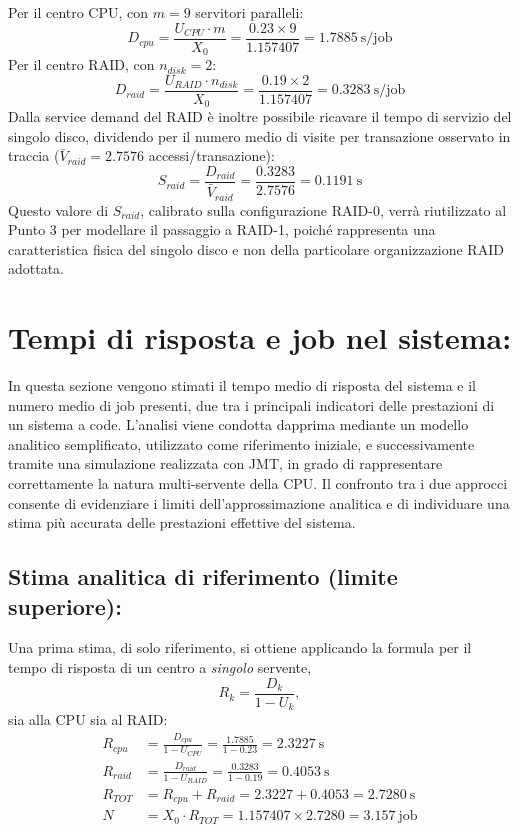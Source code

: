 \documentclass[11pt,a4paper]{article}
\begin{document}
Per il centro CPU, con $m=9$ servitori paralleli:
\begin{equation}
D_{cpu} = \frac{U_{CPU}\cdot m}{X_0} = \frac{0.23 \times 9}{1.157407} = 1.7885\ \text{s/job}
\end{equation}
Per il centro RAID, con $n_{disk}=2$:
\begin{equation}
D_{raid} = \frac{U_{RAID}\cdot n_{disk}}{X_0} = \frac{0.19\times 2}{1.157407} = 0.3283\ \text{s/job}
\end{equation}
Dalla service demand del RAID è inoltre possibile ricavare il tempo di servizio del singolo
disco, dividendo per il numero medio di visite per transazione osservato in traccia
($\bar V_{raid}=2.7576$ accessi/transazione):
\begin{equation}
S_{raid} = \frac{D_{raid}}{\bar V_{raid}} = \frac{0.3283}{2.7576} = 0.1191\ \text{s}
\end{equation}
Questo valore di $S_{raid}$, calibrato sulla configurazione RAID-0, verrà riutilizzato al Punto 3 per
modellare il passaggio a RAID-1, poiché rappresenta una caratteristica fisica del singolo disco e
non della particolare organizzazione RAID adottata.

\section{Tempi di risposta e job nel sistema: }
In questa sezione vengono stimati il tempo medio di risposta del sistema e il numero medio di job presenti, due tra i principali indicatori delle prestazioni di un sistema a code. L'analisi viene condotta dapprima mediante un modello analitico semplificato, utilizzato come riferimento iniziale, e successivamente tramite una simulazione realizzata con JMT, in grado di rappresentare correttamente la natura multi-servente della CPU. Il confronto tra i due approcci consente di evidenziare i limiti dell'approssimazione analitica e di individuare una stima più accurata delle prestazioni effettive del sistema.
\subsection{Stima analitica di riferimento (limite superiore):}

Una prima stima, di solo riferimento, si ottiene applicando la formula per il tempo di risposta di
un centro a \emph{singolo} servente,
\begin{equation}
R_k = \frac{D_k}{1-U_k},
\end{equation}
sia alla CPU sia al RAID:
\begin{align}
R_{cpu} &= \frac{D_{cpu}}{1-U_{CPU}}
         = \frac{1.7885}{1-0.23}
         = 2.3227\ \text{s} \\
R_{raid} &= \frac{D_{raid}}{1-U_{RAID}}
          = \frac{0.3283}{1-0.19}
          = 0.4053\ \text{s} \\
R_{TOT} &= R_{cpu}+R_{raid}
         = 2.3227 + 0.4053
         = 2.7280\ \text{s} \\
N &= X_0\cdot R_{TOT}
  = 1.157407 \times 2.7280
  = 3.157\ \text{job}
\end{align}
\end{document}

